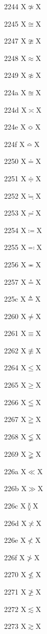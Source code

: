 \documentclass[11pt]{article}
\begin{document}
2244 X{\ensuremath{\nsimeq}}X

2245 X{\ensuremath{\cong}}X

2247 X{\ensuremath{\ncong}}X

2248 X{\ensuremath{\approx}}X

2249 X{\ensuremath{\napprox}}X

224a X{\ensuremath{\approxeq}}X

224d X{\ensuremath{\asymp}}X

224e X{\ensuremath{\Bumpeq}}X

224f X{\ensuremath{\bumpeq}}X

2250 X{\ensuremath{\doteq}}X

2251 X{\ensuremath{\doteqdot}}X

2252 X{\ensuremath{\fallingdotseq}}X

2253 X{\ensuremath{\risingdotseq}}X

2254 X{\ensuremath{\coloneq}}X

2255 X{\ensuremath{\eqcolon}}X

2256 X{\ensuremath{\eqcirc}}X

2257 X{\ensuremath{\circeq}}X

225c X{\ensuremath{\triangleq}}X

2260 X{\ensuremath{\ne}}X

2261 X{\ensuremath{\equiv}}X

2262 X{\ensuremath{\nequiv}}X

2264 X{\ensuremath{\leq}}X

2265 X{\ensuremath{\geq}}X

2266 X{\ensuremath{\leqq}}X

2267 X{\ensuremath{\geqq}}X

2268 X{\ensuremath{\lneqq}}X

2269 X{\ensuremath{\gneqq}}X

226a X{\ensuremath{\ll}}X

226b X{\ensuremath{\gg}}X

226c X{\ensuremath{\between}}X

226d X{\ensuremath{\not\asymp}}X

226e X{\ensuremath{\nless}}X

226f X{\ensuremath{\ngtr}}X

2270 X{\ensuremath{\nleq}}X

2271 X{\ensuremath{\ngeq}}X

2272 X{\ensuremath{\lesssim}}X

2273 X{\ensuremath{\gtrsim}}X
\end{document}
